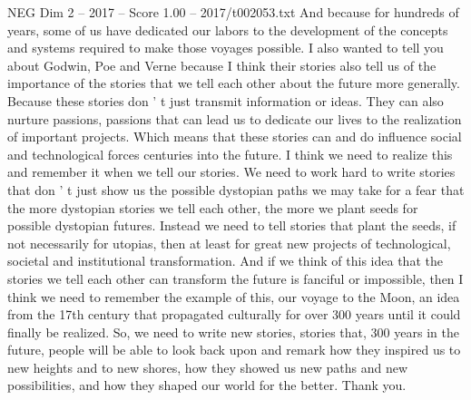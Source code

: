 \begin{textsample}{NEG Dim 2 – 2017 – Score 1.00 – 2017/t002053.txt}
And because for hundreds of years, some of us have dedicated our labors to the development of the concepts and systems required to make those voyages possible.
I also wanted to tell you about Godwin, Poe and Verne because I think their stories also tell us of the importance of the stories that we tell each other about the future more generally.
Because these stories don ' t just transmit information or ideas.
They can also nurture passions, passions that can lead us to dedicate our lives to the realization of important projects.
Which means that these stories can and do influence social and technological forces centuries into the future.
I think we need to realize this and remember it when we tell our stories.
We need to work hard to write stories that don ' t just show us the possible dystopian paths we may take for a fear that the more dystopian stories we tell each other, the more we plant seeds for possible dystopian futures.
Instead we need to tell stories that plant the seeds, if not necessarily for utopias, then at least for great new projects of technological, societal and institutional transformation.
And if we think of this idea that the stories we tell each other can transform the future is fanciful or impossible, then I think we need to remember the example of this, our voyage to the Moon, an idea from the 17th century that propagated culturally for over 300 years until it could finally be realized.
So, we need to write new stories, stories that, 300 years in the future, people will be able to look back upon and remark how they inspired us to new heights and to new shores, how they showed us new paths and new possibilities, and how they shaped our world for the better.
Thank you.

\end{textsample}
